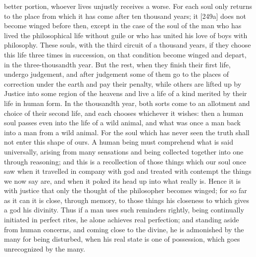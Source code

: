 better portion, whoever lives  unjustly receives a worse. For
each soul only returns to the place from which it has come after ten
thousand years; it
{[}249a{]} does not become winged before then, except in the case of the
soul of the man who has lived the philosophical life without guile or
who has united his love of boys with philosophy. These souls, with the
third circuit of a thousand years, if they choose this life three times
in succession, on that condition become winged and depart, in the
three-thousandth year. But the rest,  when they finish their
first life, undergo judgement, and after judgement some of them go to
the places of correction under the earth and pay their penalty, while
others are lifted up by Justice into some region of the heavens and live
a life of a kind merited by their life in human
form. In the thousandth
year,  both sorts come to an allotment and
choice of their second
life, and each chooses whichever it wishes: then a human soul passes
even into the life of a wild animal, and what was once a  man
back into a man from a wild animal. For the soul which has never seen
the truth shall not enter this shape of ours. A human being must
comprehend what is said universally, arising  from many
sensations and being collected together into one through reasoning; and
this is a recollection
of those things which our soul once saw when it travelled in company
with god and treated with contempt the things we now say
are, and when it poked
its head up into what really is. Hence it is  with justice that
only the thought of the philosopher becomes winged; for so far as it can
it is close, through memory, to those things his closeness to which
gives a god his divinity. Thus if a man uses such
reminders rightly, being
continually initiated in perfect rites, he alone achieves real
perfection; and standing
 aside from human concerns, and coming close to the divine, he
is admonished by the many for being disturbed, when his real state is
one of possession, which goes unrecognized by the many.


